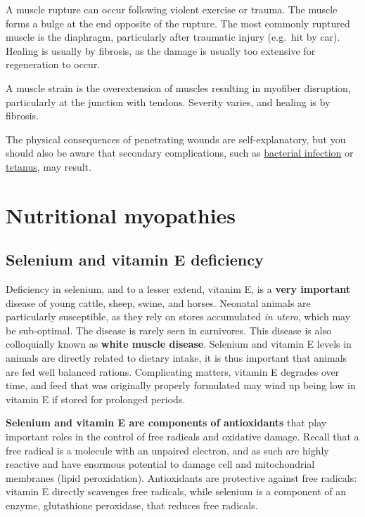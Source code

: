 \documentclass[openany]{book}
\begin{document}
A muscle rupture can occur following violent exercise or trauma. The
muscle forms a bulge at the end opposite of the rupture. The most
commonly ruptured muscle is the diaphragm, particularly after traumatic
injury (e.g.~hit by car). Healing is usually by fibrosis, as the damage
is usually too extensive for regeneration to occur.

A muscle strain is the overextension of muscles resulting in myofiber
disruption, particularly at the junction with tendons. Severity varies,
and healing is by fibrosis.

The physical consequences of penetrating wounds are self-explanatory,
but you should also be aware that secondary complications, such as
\protect\hyperlink{suppurative-myositis}{bacterial infection} or
\protect\hyperlink{tetanus}{tetanus}, may result.

\chapter{Nutritional myopathies}\label{nutritional-myopathies}

\hypertarget{selenium-and-vitamin-e-deficiency}{\section{Selenium and
vitamin E deficiency}\label{selenium-and-vitamin-e-deficiency}}

Deficiency in selenium, and to a lesser extend, vitanim E, is a
\textbf{very important} disease of young cattle, sheep, swine, and
horses. Neonatal animals are particularly susceptible, as they rely on
stores accumulated \emph{in utero}, which may be sub-optimal. The
disease is rarely seen in carnivores. This disease is also colloquially
known as \textbf{white muscle disease}. Selenium and vitamin E levels in
animals are directly related to dietary intake, it is thus important
that animals are fed well balanced rations. Complicating matters,
vitamin E degrades over time, and feed that was originally properly
formulated may wind up being low in vitamin E if stored for prolonged
periods.

\textbf{Selenium and vitamin E are components of antioxidants} that play
important roles in the control of free radicals and oxidative damage.
Recall that a free radical is a molecule with an unpaired electron, and
as such are highly reactive and have enormous potential to damage cell
and mitochondrial membranes (lipid peroxidation). Antioxidants are
protective against free radicals: vitamin E directly scavenges free
radicals, while selenium is a component of an enzyme, glutathione
peroxidase, that reduces free radicals.
\end{document}
